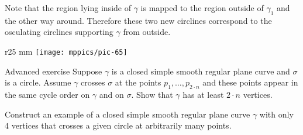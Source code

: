 \documentclass{article}
\begin{document}
Note that the region lying inside of $\gamma$ is mapped to the region outside of $\gamma_1$ and the other way around.
Therefore these two new circlines correspond to the osculating circlines supporting $\gamma$ from outside.
\qeds

\begin{wrapfigure}[5]{r}{25 mm}
\vskip-7mm
\centering
\texttt{[image: mppics/pic-65]}
\vskip0mm
\end{wrapfigure}

\begin{thm}{Advanced exercise}\label{ex:curve-crosses-circle}
Suppose $\gamma$ is a closed simple smooth regular plane curve and $\sigma$ is a circle.
Assume $\gamma$ crosses $\sigma$ at the points $p_1,\dots,p_{2{\cdot} n}$ and these points appear in the same cycle order on $\gamma$ and on $\sigma$.
Show that $\gamma$ has at least $2\cdot n$ vertices.

Construct an example of a closed simple smooth regular plane curve $\gamma$ with only 4 vertices that crosses a given circle at arbitrarily many points. 
\end{thm}



\sloppy
\printbibliography[heading=bibintoc]
\fussy
\end{document}
